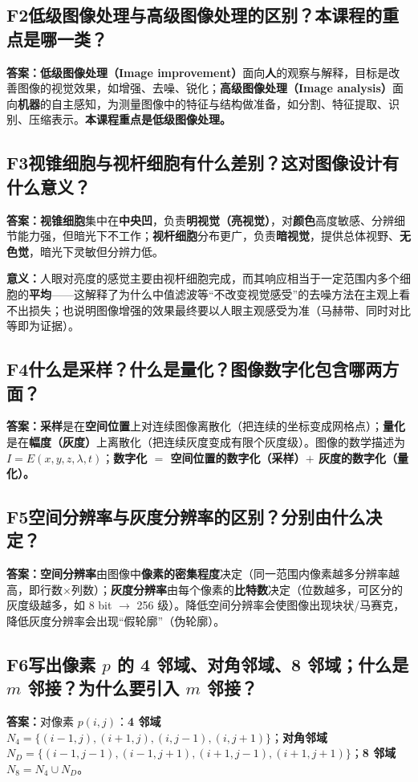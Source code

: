 \subsection*{F2\quad 低级图像处理与高级图像处理的区别？本课程的重点是哪一类？}
\textbf{答案：低级图像处理（Image improvement）}面向\textbf{人}的观察与解释，目标是改善图像的视觉效果，如增强、去噪、锐化；\textbf{高级图像处理（Image analysis）}面向\textbf{机器}的自主感知，为测量图像中的特征与结构做准备，如分割、特征提取、识别、压缩表示。\textbf{本课程重点是低级图像处理。}

\subsection*{F3\quad 视锥细胞与视杆细胞有什么差别？这对图像设计有什么意义？}
\textbf{答案：视锥细胞}集中在\textbf{中央凹}，负责\textbf{明视觉（亮视觉）}，对\textbf{颜色}高度敏感、分辨细节能力强，但暗光下不工作；\textbf{视杆细胞}分布更广，负责\textbf{暗视觉}，提供总体视野、\textbf{无色觉}，暗光下灵敏但分辨力低。

\textbf{意义：}人眼对亮度的感觉主要由视杆细胞完成，而其响应相当于一定范围内多个细胞的\textbf{平均}——这解释了为什么中值滤波等“不改变视觉感受”的去噪方法在主观上看不出损失；也说明图像增强的效果最终要以人眼主观感受为准（马赫带、同时对比等即为证据）。

\subsection*{F4\quad 什么是采样？什么是量化？图像数字化包含哪两方面？}
\textbf{答案：采样}是在\textbf{空间位置}上对连续图像离散化（把连续的坐标变成网格点）；\textbf{量化}是在\textbf{幅度（灰度）}上离散化（把连续灰度变成有限个灰度级）。图像的数学描述为 $I=E(x,y,z,\lambda,t)$；\textbf{数字化 $=$ 空间位置的数字化（采样）$+$ 灰度的数字化（量化）。}

\subsection*{F5\quad 空间分辨率与灰度分辨率的区别？分别由什么决定？}
\textbf{答案：空间分辨率}由图像中\textbf{像素的密集程度}决定（同一范围内像素越多分辨率越高，即行数$\times$列数）；\textbf{灰度分辨率}由每个像素的\textbf{比特数}决定（位数越多，可区分的灰度级越多，如 8 bit $\to$ 256 级）。降低空间分辨率会使图像出现块状/马赛克，降低灰度分辨率会出现“假轮廓”（伪轮廓）。

\subsection*{F6\quad 写出像素 $p$ 的 4 邻域、对角邻域、8 邻域；什么是 $m$ 邻接？为什么要引入 $m$ 邻接？}
\textbf{答案：}对像素 $p(i,j)$：\textbf{4 邻域} $N_4=\{(i-1,j),(i+1,j),(i,j-1),(i,j+1)\}$；\textbf{对角邻域} $N_D=\{(i-1,j-1),(i-1,j+1),(i+1,j-1),(i+1,j+1)\}$；\textbf{8 邻域} $N_8=N_4\cup N_D$。

